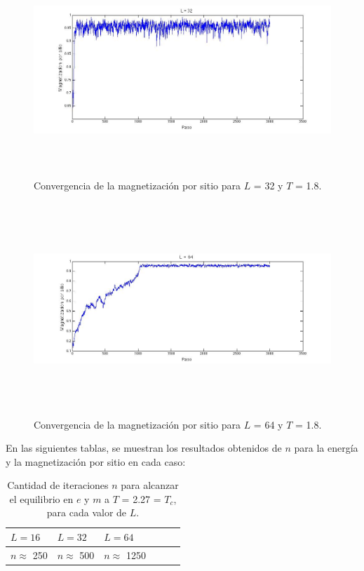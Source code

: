 \documentclass[a4paper,12pt]{article}
\begin{document}
\begin{figure}[H]
\begin{center}
\includegraphics[height=8cm]{../graficos/Mag_L32_T18.jpg}
\caption[width=5cm]{Convergencia de la magnetizaci\'on por sitio para $L$ = 32 y $T$ = 1.8.}
\end{center}
\end{figure}

\begin{figure}[H]
\begin{center}
\includegraphics[height=8cm]{../graficos/Mag_L64_T18.jpg}
\caption[width=5cm]{Convergencia de la magnetizaci\'on por sitio para $L$ = 64 y $T$ = 1.8.}
\end{center}
\end{figure}


En las siguientes tablas, se muestran los resultados obtenidos de $n$ para la energ\'ia y la magnetizaci\'on por sitio en cada caso:

\begin{table}
	\centering
    \begin{tabular}{ | l | l | l | l | l |p{5cm} |}
    \hline
    $L = 16$ & $L = 32$ & $L = 64$\\ \hline
    $n \approx$ 250 & $n \approx$ 500 & $n \approx$ 1250  \\ \hline
        
    \end{tabular}
    \caption{Cantidad de iteraciones $n$ para alcanzar el equilibrio en $e$ y $m$ a $T$ = 2.27 = $T_{c}$, para cada valor de $L$.}
    \label{table:1}
\end{table}
\end{document}
